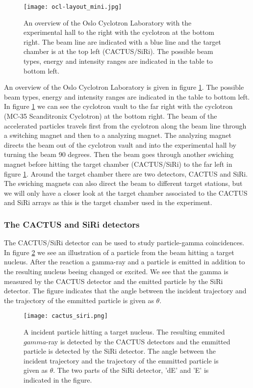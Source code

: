 \documentclass[11pt,a4wide]{article}
\begin{document}
\begin{figure}[htp]
\centering
\texttt{[image: ocl-layout\_mini.jpg]}
\caption{An overview of the Oslo Cyclotron Laboratory with the experimental hall to the right with the cyclotron at the bottom right. The beam line are indicated with a blue line and the target chamber is at the top left (CACTUS/SiRi). The possible beam types, energy and intensity ranges are indicated in the table to bottom left. }
\label{fig:OLC_exp_hall}
\end{figure}

An overview of the Oslo Cyclotron Laboratory is given in figure \ref{fig:OLC_exp_hall}. The possible beam types, energy and intensity ranges are indicated in the table to bottom left. In figure \ref{fig:OLC_exp_hall} we can see the cyclotron vault to the far right with the cyclotron (MC-35 Scanditronix Cyclotron) at the bottom right. The beam of the accelerated particles travels first from the cyclotron along the beam line through a switching magnet and then to a analyzing magnet. The analyzing magnet directs the beam out of the cyclotron vault and into the experimental hall by turning the beam 90 degrees. Then the beam goes through another swiching magnet before hitting the target chamber (CACTUS/SiRi) to the far left in figure \ref{fig:OLC_exp_hall}. Around the target chamber there are two detectors, CACTUS and SiRi. The swiching magnets can also direct the beam to different target stations, but we will only have a closer look at the target chamber associated to the CACTUS and SiRi arrays as this is the target chamber used in the experiment. 


\subsubsection{The CACTUS and SiRi detectors}
The CACTUS/SiRi detector can be used to study particle-gamma coincidences. In figure \ref{fig: cactus_siri} we see an illustration of a particle from the beam hitting a target nucleus. After the reaction a gamma-ray and a particle is emitted in addition to the resulting nucleus beeing changed or excited. We see that the gamma is measured by the CACTUS detector and the emitted particle by the SiRi detector. The figure indicates that the angle between the incident trajectory and the trajectory of the emmitted particle is given as $\theta$.
\begin{figure}[htp]
\centering
\texttt{[image: cactus\_siri.png]}
\caption{A incident particle hitting a target nucleus. The resulting emmited $gamma$-ray is detected by the CACTUS detectors and the emmitted particle is detected by the SiRi detector. The angle between the incident trajectory and the trajectory of the emmitted particle is given as $\theta$. The two parts of the SiRi detector, 'dE' and 'E' is indicated in the figure.}
\label{fig: cactus_siri}
\end{figure}
\end{document}
